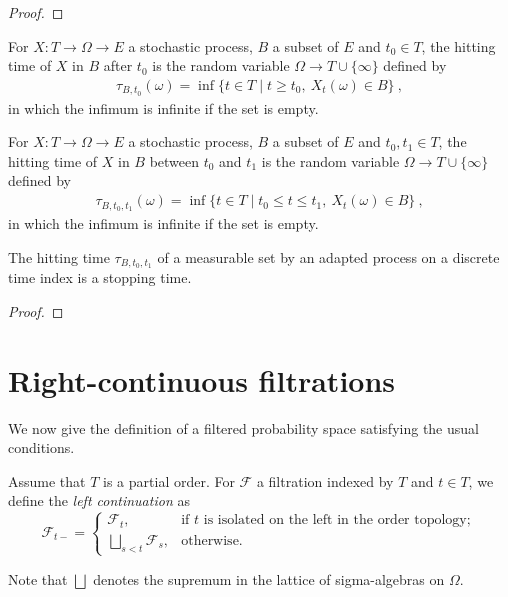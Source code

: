\begin{proof}\leanok

\end{proof}


\begin{definition}\label{def:hittingAfter}
  \mathlibok
For $X : T \to \Omega \to E$ a stochastic process, $B$ a subset of $E$ and $t_0 \in T$, the hitting time of $X$ in $B$ after $t_0$ is the random variable $\Omega \to T\cup\{\infty\}$ defined by
\begin{align*}
  \tau_{B, t_0}(\omega) = \inf\{t \in T \mid t \ge t_0, \: X_t(\omega) \in B\} \: ,
\end{align*}
in which the infimum is infinite if the set is empty.
\end{definition}


\begin{definition}\label{def:hittingBtwn}
  \mathlibok
For $X : T \to \Omega \to E$ a stochastic process, $B$ a subset of $E$ and $t_0, t_1 \in T$, the hitting time of $X$ in $B$ between $t_0$ and $t_1$ is the random variable $\Omega \to T\cup\{\infty\}$ defined by
\begin{align*}
  \tau_{B, t_0, t_1}(\omega) = \inf\{t \in T \mid t_0 \le t \le t_1, \: X_t(\omega) \in B\} \: ,
\end{align*}
in which the infimum is infinite if the set is empty.
\end{definition}


\begin{lemma}\label{lem:isStoppingTime_hittingBtwn}
  \mathlibok
The hitting time $\tau_{B, t_0, t_1}$ of a measurable set by an adapted process on a discrete time index is a stopping time.
\end{lemma}

\begin{proof}\leanok

\end{proof}


\section{Right-continuous filtrations}

We now give the definition of a filtered probability space satisfying the usual conditions.


\begin{definition}\label{def:leftLimitFiltration}
Assume that $T$ is a partial order. For $\mathcal{F}$ a filtration indexed by $T$ and $t \in T$, we define the \emph{left continuation} as
$$\mathcal{F}_{t-} =
  \begin{cases}
    \mathcal{F}_t, & \text{if $t$ is isolated on the left in the order topology}; \\
    \bigsqcup_{s < t} \mathcal{F}_s, & \text{otherwise}.
  \end{cases}
$$

Note that $\bigsqcup$ denotes the supremum in the lattice of sigma-algebras on $\Omega$.
\end{definition}


